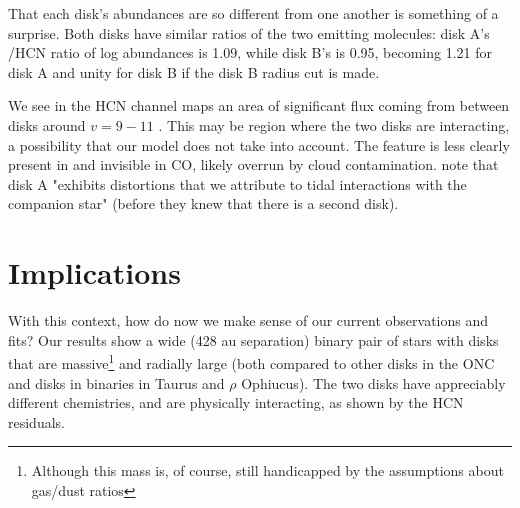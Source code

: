 That each disk's abundances are so different from one another is something of a surprise. Both disks have similar ratios of the two emitting molecules: disk A's \hco/HCN ratio of log abundances is 1.09, while disk B's is 0.95, becoming 1.21 for disk A and unity for disk B if the disk B radius cut is made.












We see in the HCN channel maps an area of significant flux coming from between disks around $ v = 9-11$ \kms. This may be region where the two disks are interacting, a possibility that our model does not take into account. The feature is less clearly present in \hco and invisible in CO, likely overrun by cloud contamination. \citet{Smith2005} note that disk A "exhibits distortions that we attribute to tidal interactions with the companion star" (before they knew that there is a second disk).













\section{Implications}

With this context, how do now we make sense of our current observations and fits? Our results show a wide (428 au separation) binary pair of stars with disks that are massive\footnote{Although this mass is, of course, still handicapped by the assumptions about gas/dust ratios} and radially large (both compared to other disks in the ONC and disks in binaries in Taurus and $\rho$ Ophiucus). The two disks have appreciably different chemistries, and are physically interacting, as shown by the HCN residuals.


